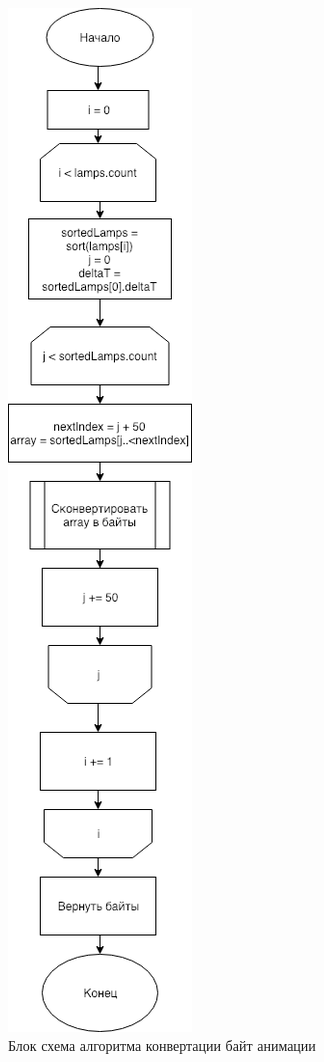 ~
\begin{figure}[H]
\centering
	\includegraphics[scale=0.5]{figures/bytesSending.png}
	\caption{Блок схема алгоритма конвертации байт анимации}
	\label{fig:appendices:algorithms:bytesSending}
\end{figure}
